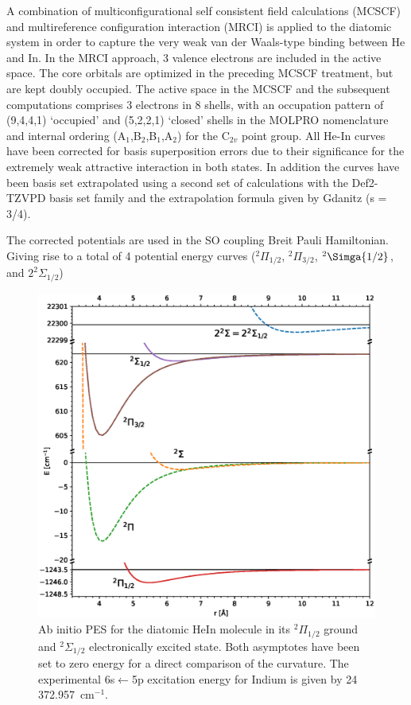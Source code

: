 \documentclass[twoside,twocolumn,9pt]{article}
\begin{document}
A combination of multiconfigurational self consistent field calculations (MCSCF\cite{Knowles1985, Werner1985}) and multireference configuration interaction (MRCI\cite{WK88, KW92}) is applied to the diatomic system in order to capture the very weak van der Waals-type binding between He and In. In the MRCI approach, 3 valence electrons are included in the active space. The core orbitals are optimized in the preceding MCSCF treatment, but are kept doubly occupied.
The active space in the MCSCF and the subsequent computations comprises 3 electrons in 8 shells, with an occupation pattern of (9,4,4,1) `occupied' and (5,2,2,1) `closed' shells in the MOLPRO nomenclature and internal ordering (A$_1$,B$_2$,B$_1$,A$_2$) for the C$_{2v}$ point group. All He-In curves have been corrected for basis superposition errors due to their significance for the extremely weak attractive interaction in both states.\cite{boys70} In addition the curves have been basis set extrapolated using a second set of calculations with the Def2-TZVPD basis set family and the extrapolation formula given by Gdanitz \cite{Gdanitz2000} (s = 3/4).

The corrected potentials are used in the SO coupling Breit Pauli Hamiltonian. Giving rise to a total of 4 potential energy curves ($^2\Pi_{1/2}$, $^2\Pi_{3/2} $, $^2\Simga{1/2} $, and $2^2\Sigma_{1/2}$)

\begin{figure}[h!]
  	\begin{center}
 		\includegraphics[width=\columnwidth]{in_pot.eps}
                \caption{Ab initio PES for the diatomic HeIn molecule in its $^2\Pi{}_{1/2}$ ground and $^2\Sigma{}_{1/2}$ electronically excited state. Both asymptotes have been set to zero energy for a direct comparison of the curvature. The experimental 6s$\leftarrow{}$5p excitation energy for Indium is given by 24 372.957~cm$^{-1}$.\cite{NIST}\label{pic:pes}}
  	\end{center}
\end{figure}
\end{document}
